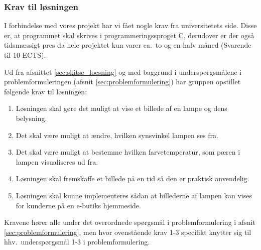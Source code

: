 \subsubsection{Krav til løsningen}
\label{sec:krav}

I forbindelse med vores projekt har vi fået nogle krav fra universitetets side. Disse er, at programmet skal skrives i programmeringssproget C, derudover er der også tidsmæssigt pres da hele projektet kun varer ca.\ to og en halv måned (Svarende til 10 ECTS). 

Ud fra afsnittet \ref{sec:skitse_loesning} og med baggrund i underspørgsmålene i problemformuleringen (afsnit \ref{sec:problemformulering}) har gruppen opstillet følgende krav til løsningen:
\begin{enumerate}
    \item Løsningen skal gøre det muligt at vise et billede af en lampe og dens belysning.
    \item Det skal være muligt at ændre, hvilken synsvinkel lampen ses fra.
    \item Det skal være muligt at bestemme hvilken farvetemperatur, som pæren i lampen visualiseres ud fra.
    \item Løsningen skal fremskaffe et billede på en tid så den er praktisk anvendelig.
    \item Løsningen skal kunne implementeres sådan at billederne af lampen kan vises for kunderne på en e-butiks hjemmeside.
\end{enumerate}

Kravene hører alle under det overordnede spørgsmål i problemformulering i afsnit \ref{sec:problemformulering}, men hvor ovenstående krav 1-3 specifikt knytter sig til hhv.\ underspørgsmål 1-3 i problemformulering.